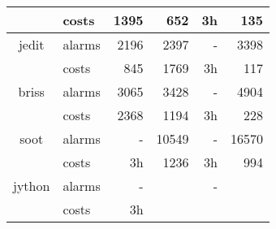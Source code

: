 \begin{table}[]
\begin{tabular}{clrrrr}
		& costs  & 1395                       & 652                        & 3h                       & 135                        \\\midrule
		jedit    & alarms & 2196                     & 2397                       & -                         & 3398                       \\
		& costs  & 845                    & 1769                       & 3h                       & 117                        \\\midrule
		briss    & alarms &  3065                        & 3428                       &   -                       & 4904                       \\
		& costs  & 2368                       & 1194                       & 3h                       & 228                        \\\midrule
		soot     & alarms &     -                     & 10549                      &      -                    & 16570                      \\
		& costs  & 3h                       & 1236                       & 3h                       & 994                        \\\midrule
		jython     & alarms &     -                     &                       &      -                    &                       \\
		& costs  & 3h                       &                        &                        &                         \\ \bottomrule
	\end{tabular}
\end{table}
